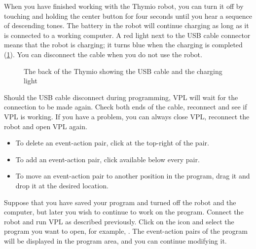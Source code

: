
When you have finished working with the Thymio robot, you can turn it
off by touching and holding the center button for four seconds until
you hear a sequence of descending tones. The battery in the robot will
continue charging as long as it is connected to a working computer. A
red light next to the USB cable connector means that the robot is
charging; it turns blue when the charging is completed (\cref{fig.back}).
You can disconnect the cable when you do not use the robot.


\begin{figure}
\begin{center}
\caption{The back of the Thymio showing the USB cable and the
 charging light}\label{fig.back}
\end{center}
\end{figure}

Should the USB cable disconnect during programming, VPL will wait for the connection to be made again.
Check both ends of the cable, reconnect and see if VPL is working.
If you have a problem, you can always close VPL, reconnect the robot and open VPL again.


\begin{itemize}

\item To delete an event-action pair, click  at the top-right of the pair.
\item To add an event-action pair, click  available below every pair.
\item To move an event-action pair to another position in the program, drag it and drop it at the desired location.

\end{itemize}


Suppose that you have saved your program and turned off the robot and
the computer, but later you wish to continue to work on the program.
Connect the robot and run VPL as described previously. Click on the icon
 and select the program you want to open, for example,
. The event-action pairs of the program will be displayed in
the program area, and you can continue modifying it.

